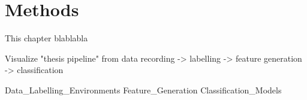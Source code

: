 \chapter{Methods} \label{ch:methods}

This chapter blablabla

Visualize "thesis pipeline" from data recording -> labelling -> feature generation -> classification

{Data_Labelling_Environments}
{Feature_Generation}
{Classification_Models}